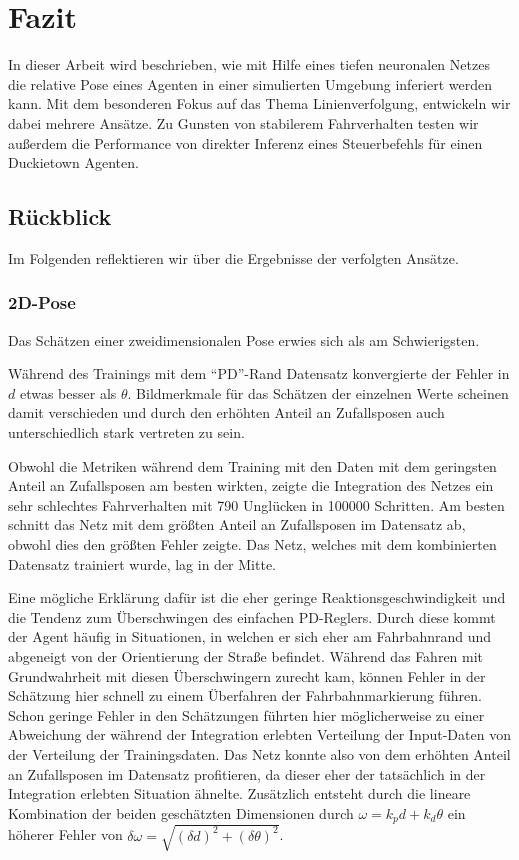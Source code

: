 \chapter{Fazit}

In dieser Arbeit wird beschrieben, wie mit Hilfe eines tiefen neuronalen Netzes die relative Pose eines Agenten in einer simulierten Umgebung inferiert werden kann. Mit dem besonderen Fokus auf das Thema Linienverfolgung, entwickeln wir dabei mehrere Ansätze. Zu Gunsten von stabilerem Fahrverhalten testen wir außerdem die Performance von direkter Inferenz eines Steuerbefehls für einen Duckietown Agenten.

\section{Rückblick}

Im Folgenden reflektieren wir über die Ergebnisse der verfolgten Ansätze.

\subsection{2D-Pose}

Das Schätzen einer zweidimensionalen Pose erwies sich als am Schwierigsten.

Während des Trainings mit dem ``PD''-Rand Datensatz konvergierte der Fehler in $d$ etwas besser als $\theta$. Bildmerkmale für das Schätzen der einzelnen Werte scheinen damit verschieden und durch den erhöhten Anteil an Zufallsposen auch unterschiedlich stark vertreten zu sein.

Obwohl die Metriken während dem Training mit den Daten mit dem geringsten Anteil an Zufallsposen am besten wirkten, zeigte die Integration des Netzes ein sehr schlechtes Fahrverhalten mit 790 Unglücken in 100000 Schritten. Am besten schnitt das Netz mit dem größten Anteil an Zufallsposen im Datensatz ab, obwohl dies den größten Fehler zeigte. Das Netz, welches mit dem kombinierten Datensatz trainiert wurde, lag in der Mitte.

Eine mögliche Erklärung dafür ist die eher geringe Reaktionsgeschwindigkeit und die Tendenz zum Überschwingen des einfachen PD-Reglers. Durch diese kommt der Agent häufig in Situationen, in welchen er sich eher am Fahrbahnrand und abgeneigt von der Orientierung der Straße befindet. Während das Fahren mit Grundwahrheit mit diesen Überschwingern zurecht kam, können Fehler in der Schätzung hier schnell zu einem Überfahren der Fahrbahnmarkierung führen. Schon geringe Fehler in den Schätzungen führten hier möglicherweise zu einer Abweichung der während der Integration erlebten Verteilung der Input-Daten von der Verteilung der Trainingsdaten. Das Netz konnte also von dem erhöhten Anteil an Zufallsposen im Datensatz profitieren, da dieser eher der tatsächlich in der Integration erlebten Situation ähnelte. Zusätzlich entsteht durch die lineare Kombination der beiden geschätzten Dimensionen durch $\omega = k_p d + k_d \theta$ ein höherer Fehler von $\delta\omega = \sqrt{(\delta d)^2 + (\delta \theta)^2}$.

